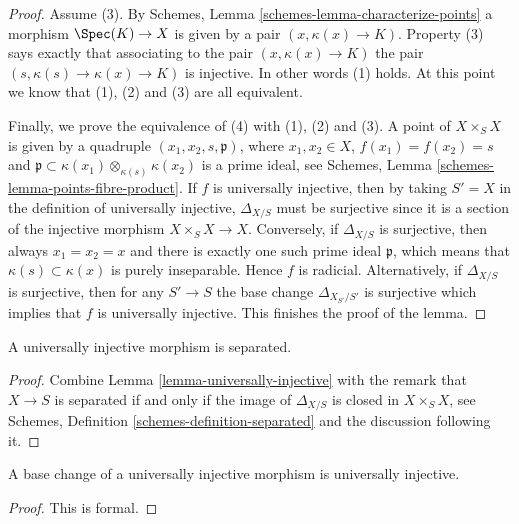 \begin{proof}
\medskip\noindent
Assume (3). By
Schemes, Lemma \ref{schemes-lemma-characterize-points}
a morphism $\Spec(K) \to X$ is given by a pair $(x, \kappa(x) \to K)$.
Property (3) says exactly that associating to the pair
$(x, \kappa(x) \to K)$ the pair $(s, \kappa(s) \to \kappa(x) \to K)$
is injective. In other words (1) holds. At this point we know that
(1), (2) and (3) are all equivalent.

\medskip\noindent
Finally, we prove the equivalence of (4) with (1), (2) and (3).
A point of $X \times_S X$ is given by a quadruple
$(x_1, x_2, s, \mathfrak p)$, where $x_1, x_2 \in X$,
$f(x_1) = f(x_2) = s$ and
$\mathfrak p \subset \kappa(x_1) \otimes_{\kappa(s)} \kappa(x_2)$
is a prime ideal, see
Schemes, Lemma \ref{schemes-lemma-points-fibre-product}.
If $f$ is universally injective, then
by taking $S'=X$ in the definition of universally injective,
$\Delta_{X/S}$ must be surjective since it is a section of
the injective morphism
$X \times_S X  \longrightarrow X$.
Conversely, if
$\Delta_{X/S}$ is surjective, then always $x_1 = x_2 = x$ and there
is exactly one such prime ideal $\mathfrak p$, which means that
$\kappa(s) \subset \kappa(x)$ is purely inseparable.
Hence $f$ is radicial.
Alternatively, if $\Delta_{X/S}$ is surjective,
then for any $S' \to S$ the base
change $\Delta_{X_{S'}/S'}$ is surjective which implies that $f$
is universally injective. This finishes the proof of the lemma.
\end{proof}

\begin{lemma}
\label{lemma-universally-injective-separated}
A universally injective morphism is separated.
\end{lemma}

\begin{proof}
Combine
Lemma \ref{lemma-universally-injective}
with the remark that $X \to S$ is separated if and only if the image
of $\Delta_{X/S}$ is closed in $X \times_S X$, see
Schemes, Definition \ref{schemes-definition-separated}
and the discussion following it.
\end{proof}

\begin{lemma}
\label{lemma-base-change-universally-injective}
A base change of a universally injective morphism is universally injective.
\end{lemma}

\begin{proof}
This is formal.
\end{proof}

